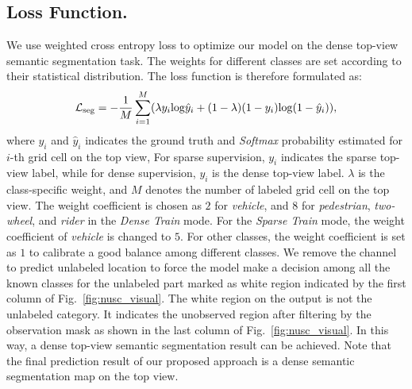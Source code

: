 \documentclass[lettersize,journal]{IEEEtran}
\begin{document}
\subsection{Loss Function.}
We use weighted cross entropy loss to optimize our model on the dense top-view semantic segmentation task. 
The weights for different classes are set according to their statistical distribution. The loss function is therefore formulated as:
\begin{equation}
    \centering
        \mathcal{L}_{\mathrm{seg}} = -\frac{1}{M}\sum_{i=1}^{M}(\lambda y_i\mathrm{log}\hat{y}_i+(1-\lambda)(1-y_i)\mathrm{log}(1-\hat{y}_i)),
\end{equation}
where $y_i$ and $\hat{y}_i$ indicates the ground truth and \emph{Softmax} probability estimated for $i$-th grid cell on the top view, For sparse supervision, $y_i$ indicates the sparse top-view label, while for dense supervision, $y_i$ is the dense top-view label. $\lambda$ is the class-specific weight, and $M$ denotes the number of labeled grid cell on the top view.
The weight coefficient is chosen as $2$ for \emph{vehicle}, and $8$ for \emph{pedestrian}, \emph{two-wheel}, and \emph{rider} in the \emph{Dense Train} mode. For the \emph{Sparse Train} mode, the weight coefficient of \emph{vehicle} is changed to $5$. For other classes, the weight coefficient is set as $1$ to calibrate a good balance among different classes. We remove the channel to predict unlabeled location to force the model make a decision among all the known classes for the unlabeled part marked as white region indicated by the first column of Fig.~\ref{fig:nusc_visual}. The white region on the output is not the unlabeled category. It indicates the unobserved region after filtering by the observation mask as shown in the last column of Fig.~\ref{fig:nusc_visual}. In this way, a dense top-view semantic segmentation result can be achieved. Note that the final prediction result of our proposed approach is a dense semantic segmentation map on the top view.
\end{document}

